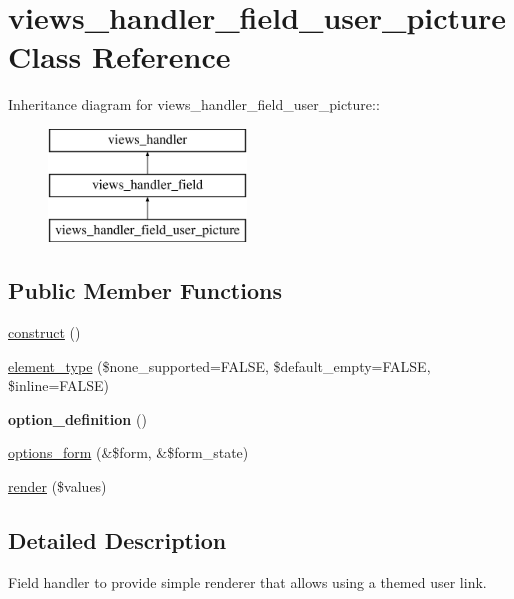 \hypertarget{classviews__handler__field__user__picture}{
\section{views\_\-handler\_\-field\_\-user\_\-picture Class Reference}
\label{classviews__handler__field__user__picture}
}
Inheritance diagram for views\_\-handler\_\-field\_\-user\_\-picture::\begin{figure}[H]
\begin{center}
\leavevmode
\includegraphics[height=3cm]{classviews__handler__field__user__picture}
\end{center}
\end{figure}
\subsection*{Public Member Functions}
\begin{DoxyCompactItemize}
\item 
\hyperlink{classviews__handler__field__user__picture_a65f7bf025afe7e60df88cfe9a72eaf4a}{construct} ()
\item 
\hyperlink{classviews__handler__field__user__picture_aa6bb83c59c2ef592545cbdf9a41f9878}{element\_\-type} (\$none\_\-supported=FALSE, \$default\_\-empty=FALSE, \$inline=FALSE)
\item 
\hypertarget{classviews__handler__field__user__picture_a331b4b4b76069a9bd58466d76adf0644}{
{\bfseries option\_\-definition} ()}
\label{classviews__handler__field__user__picture_a331b4b4b76069a9bd58466d76adf0644}

\item 
\hyperlink{classviews__handler__field__user__picture_a44c8350ed38c78e221297850e8235692}{options\_\-form} (\&\$form, \&\$form\_\-state)
\item 
\hyperlink{classviews__handler__field__user__picture_a707edb06f305fa88542f20cbfec36a04}{render} (\$values)
\end{DoxyCompactItemize}


\subsection{Detailed Description}
Field handler to provide simple renderer that allows using a themed user link. 

